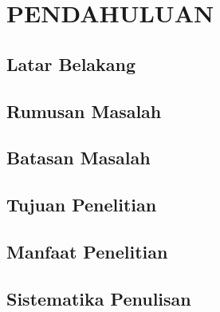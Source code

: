 \documentclass[ugmskripsi]{ugmskripsi}
\begin{document}
\begin{abstracteng}
  
\end{abstracteng}


\chapter{PENDAHULUAN}
\label{PENDAHULUAN}

	\section{Latar Belakang}
	\label{pendahuluan latar belakang}
	

	\section{Rumusan Masalah}
	\label{pendahuluan rumusan masalah}
	

	\section{Batasan Masalah}
	\label{pendahuluan batasan masalah}
	

	\section{Tujuan Penelitian}
	\label{pendahuluan tujuan penelitian}
	

	\section{Manfaat Penelitian}
	\label{pendahuluan manfaat penelitian}
	

	\section{Sistematika Penulisan}
	\label{pendahuluan sistematika penulisan}
	
\end{document}
